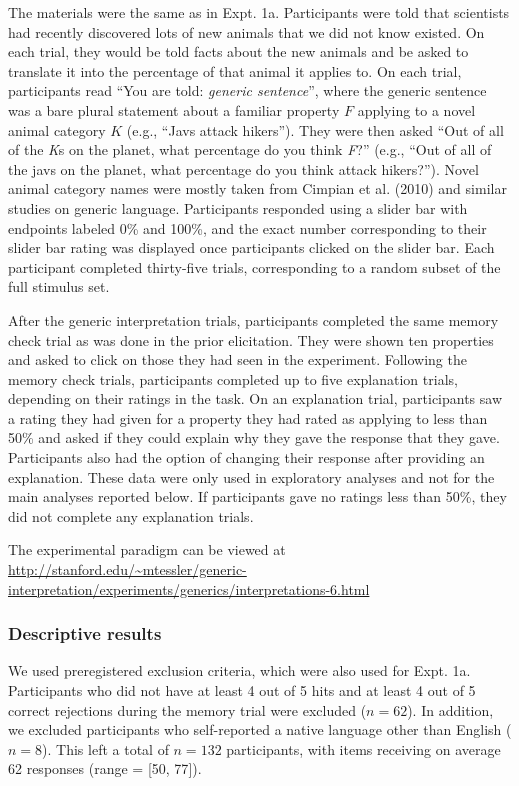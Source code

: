 \documentclass[floatsintext,doc]{apa6}
\begin{document}
The materials were the same as in Expt. 1a.
Participants were told that scientists had recently discovered lots of new animals that we did not know existed.
On each trial, they would be told facts about the new animals and be asked to translate it into the percentage of that animal it applies to.
On each trial, participants read \enquote{You are told: \emph{generic sentence}}, where the generic sentence was a bare plural statement about a familiar property \(F\) applying to a novel animal category \(K\) (e.g., \enquote{Javs attack hikers}).
They were then asked \enquote{Out of all of the \emph{K}s on the planet, what percentage do you think \emph{F}?} (e.g., \enquote{Out of all of the javs on the planet, what percentage do you think attack hikers?}).
Novel animal category names were mostly taken from Cimpian et al. (2010) and similar studies on generic language.
Participants responded using a slider bar with endpoints labeled 0\% and 100\%, and the exact number corresponding to their slider bar rating was displayed once participants clicked on the slider bar.
Each participant completed thirty-five trials, corresponding to a random subset of the full stimulus set.

After the generic interpretation trials, participants completed the same memory check trial as was done in the prior elicitation.
They were shown ten properties and asked to click on those they had seen in the experiment.
Following the memory check trials, participants completed up to five explanation trials, depending on their ratings in the task.
On an explanation trial, participants saw a rating they had given for a property they had rated as applying to less than 50\% and asked if they could explain why they gave the response that they gave.
Participants also had the option of changing their response after providing an explanation.
These data were only used in exploratory analyses and not for the main analyses reported below.
If participants gave no ratings less than 50\%, they did not complete any explanation trials.

The experimental paradigm can be viewed at \url{http://stanford.edu/~mtessler/generic-interpretation/experiments/generics/interpretations-6.html}

\hypertarget{descriptive-results}{%
\subsubsection{Descriptive results}\label{descriptive-results}}

We used preregistered exclusion criteria, which were also used for Expt. 1a.
Participants who did not have at least 4 out of 5 hits and at least 4 out of 5 correct rejections during the memory trial were excluded (\(n = 62\)).
In addition, we excluded participants who self-reported a native language other than English (\(n = 8\)).
This left a total of \(n = 132\) participants, with items receiving on average 62 responses (range = {[}50, 77{]}).
\end{document}
